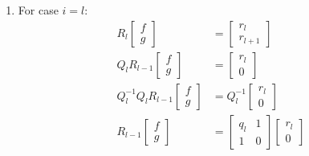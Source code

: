 \documentclass[11pt,a4paper]{article}
\begin{document}
\begin{enumerate}
\begin{enumerate}
		            \newpage
		      \item For case $i = l$:
		            \begin{align*}
			            R_l\begin{bmatrix}
				               f \\ g
			               \end{bmatrix}                  & = \begin{bmatrix}
				                                                  r_l \\ r_{l + 1}
			                                                  \end{bmatrix}                 \\
			            Q_lR_{l - 1}\begin{bmatrix}
				                        f \\ g
			                        \end{bmatrix}         & = \begin{bmatrix}
				                                                  r_l \\ 0
			                                                  \end{bmatrix}                  \\
			            Q_l^{-1}Q_lR_{l - 1}\begin{bmatrix}
				                                f \\ g
			                                \end{bmatrix} & = Q_l^{-1}\begin{bmatrix}
				                                                          r_l \\ 0
			                                                          \end{bmatrix}          \\
			            R_{l - 1}\begin{bmatrix}
				                     f \\ g
			                     \end{bmatrix}            & = \begin{bmatrix}
				                                                  q_l & 1 \\ 1 & 0
			                                                  \end{bmatrix} \begin{bmatrix}
				                                                                r_l \\ 0

\end{bmatrix}
\end{align*}
\end{enumerate}
\end{enumerate}
\end{document}
